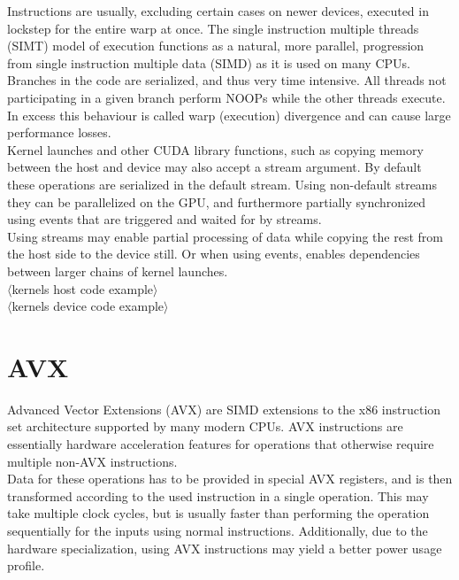 \documentclass{tudscrreprt}
\newcommand{\markr}[1]{\textcolor{review}{$\langle$#1$\rangle$}}
\begin{document}
				Instructions are usually, excluding certain cases on newer devices, executed in lockstep for the entire warp at once. The single instruction multiple threads (SIMT) model of execution functions as a natural, more parallel, progression from single instruction multiple data (SIMD) as it is used on many CPUs. \\
				Branches in the code are serialized, and thus very time intensive. All threads not participating in a given branch perform NOOPs while the other threads execute. In excess this behaviour is called warp (execution) divergence and can cause large performance losses. \\
				
				Kernel launches and other CUDA library functions, such as copying memory between the host and device may also accept a stream argument. By default these operations are serialized in the default stream. Using non-default streams they can be parallelized on the GPU, and furthermore partially synchronized using events that are triggered and waited for by streams. \\
				Using streams may enable partial processing of data while copying the rest from the host side to the device still. Or when using events, enables dependencies between larger chains of kernel launches. \\
				
				\markr{kernels host code example}\\
				
				\markr{kernels device code example}\\
			
		\section{AVX}
			Advanced Vector Extensions (AVX) are SIMD extensions to the x86 instruction set architecture supported by many modern CPUs. AVX instructions are essentially hardware acceleration features for operations that otherwise require multiple non-AVX instructions. \\
			Data for these operations has to be provided in special AVX registers, and is then transformed according to the used instruction in a single operation. This may take multiple clock cycles, but is usually faster than performing the operation sequentially for the inputs using normal instructions. Additionally, due to the hardware specialization, using AVX instructions may yield a better power usage profile. \\
			
\end{document}
